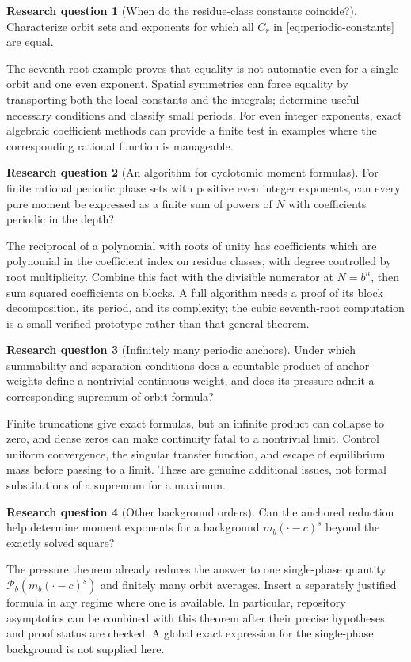 \documentclass[11pt,a4paper]{article}
\numberwithin{equation}{section}
\theoremstyle{definition}
\newtheorem{question}{Research question}
\theoremstyle{remark}
\newcommand{\PP}{\mathcal P}
\begin{document}
\begin{question}[When do the residue-class constants coincide?]
Characterize orbit sets and exponents for which all $C_r$ in
\cref{eq:periodic-constants} are equal.
\end{question}
The seventh-root example proves that equality is not automatic even
for a single orbit and one even exponent. Spatial symmetries can force
equality by transporting both the local constants and the integrals;
determine useful necessary conditions and classify small periods.
For even integer exponents, exact algebraic coefficient methods can
provide a finite test in examples where the corresponding rational
function is manageable.

\begin{question}[An algorithm for cyclotomic moment formulas]
For finite rational periodic phase sets with positive even integer
exponents, can every pure moment be expressed as a finite sum of powers
of $N$ with coefficients periodic in the depth?
\end{question}
The reciprocal of a polynomial with roots of unity has coefficients
which are polynomial in the coefficient index on residue classes,
with degree controlled by root multiplicity. Combine this fact with
the divisible numerator at $N=b^n$, then sum squared coefficients on
blocks. A full algorithm needs a proof of its block decomposition,
its period, and its complexity; the cubic seventh-root computation is
a small verified prototype rather than that general theorem.

\begin{question}[Infinitely many periodic anchors]
Under which summability and separation conditions does a countable
product of anchor weights define a nontrivial continuous weight, and
does its pressure admit a corresponding supremum-of-orbit formula?
\end{question}
Finite truncations give exact formulas, but an infinite product can
collapse to zero, and dense zeros can make continuity fatal to a
nontrivial limit. Control uniform convergence, the singular transfer
function, and escape of equilibrium mass before passing to a limit.
These are genuine additional issues, not formal substitutions of a
supremum for a maximum.

\begin{question}[Other background orders]
Can the anchored reduction help determine moment exponents for a
background $m_b(\cdot-c)^s$ beyond the exactly solved square?
\end{question}
The pressure theorem already reduces the answer to one single-phase
quantity $\PP_b(m_b(\cdot-c)^s)$ and finitely many orbit averages.
Insert a separately justified formula in any regime where one is
available. In particular, repository asymptotics can be combined with
this theorem after their precise hypotheses and proof status are
checked. A global exact expression for the single-phase background is
not supplied here.
\end{document}
